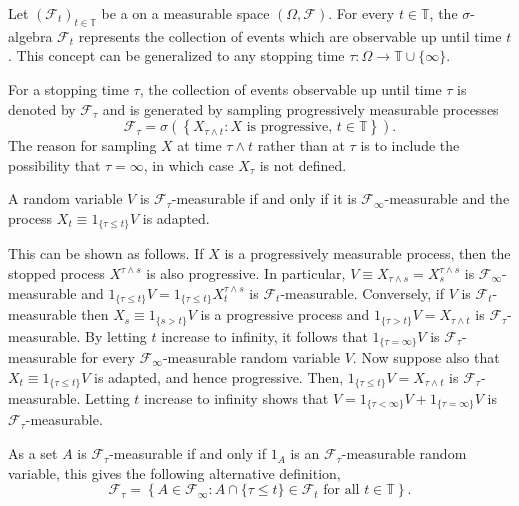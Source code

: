 \documentclass[12pt]{article}
\begin{document}

Let $(\mathcal{F}_t)_{t\in\mathbb{T}}$ be a  on a measurable space $(\Omega,\mathcal{F})$. For every $t\in\mathbb{T}$, the $\sigma$-algebra $\mathcal{F}_t$ represents the collection of events which are observable up until time $t$. This concept can be generalized to any stopping time $\tau\colon\Omega\rightarrow\mathbb{T}\cup\{\infty\}$.

For a stopping time $\tau$, the collection of events observable up until time $\tau$ is denoted by $\mathcal{F}_\tau$ and is generated by sampling progressively measurable processes
\begin{equation*}
\mathcal{F}_\tau=\sigma\left(\left\{X_{\tau\wedge t}: X\textrm{ is progressive, }t\in\mathbb{T}\right\}\right).
\end{equation*}
The reason for sampling $X$ at time $\tau\wedge t$ rather than at $\tau$ is to include the possibility that $\tau=\infty$, in which case $X_\tau$ is not defined.

A random variable $V$ is $\mathcal{F}_{\tau}$-measurable if and only if it is $\mathcal{F}_\infty$-measurable and the process $X_t\equiv 1_{\{\tau\le t\}}V$ is adapted.

This can be shown as follows. If $X$ is a progressively measurable process, then the stopped process $X^{\tau\wedge s}$ is also progressive. In particular, $V\equiv X_{\tau\wedge s}=X^{\tau\wedge s}_s$ is $\mathcal{F}_\infty$-measurable and $1_{\{\tau\le t\}}V=1_{\{\tau\le t\}}X^{\tau\wedge s}_t$ is $\mathcal{F}_t$-measurable.
Conversely, if $V$ is $\mathcal{F}_t$-measurable then $X_s\equiv 1_{\{s> t\}}V$ is a progressive process and $1_{\{\tau> t\}}V=X_{\tau\wedge t}$ is $\mathcal{F}_\tau$-measurable. By letting $t$ increase to infinity, it follows that $1_{\{\tau=\infty\}}V$ is $\mathcal{F}_\tau$-measurable for every $\mathcal{F}_\infty$-measurable random variable $V$.
Now suppose also that $X_t\equiv 1_{\{\tau\le t\}}V$ is adapted, and hence progressive. Then, $1_{\{\tau\le t\}}V=X_{\tau\wedge t}$ is $\mathcal{F}_\tau$-measurable. Letting $t$ increase to infinity shows that $V=1_{\{\tau<\infty\}}V+1_{\{\tau=\infty\}}V$ is $\mathcal{F}_\tau$-measurable.

As a set $A$ is $\mathcal{F}_\tau$-measurable if and only if $1_A$ is an $\mathcal{F}_\tau$-measurable random variable, this gives the following alternative definition,
\begin{equation*}
\mathcal{F}_\tau=\left\{A\in\mathcal{F}_\infty:A\cap\{\tau\le t\}\in\mathcal{F}_t\textrm{ for all }t\in\mathbb{T}\right\}.
\end{equation*}
\end{document}
